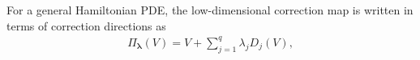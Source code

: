 \documentclass[11pt,a4paper]{article}
\theoremstyle{definition}
\theoremstyle{remark}
\numberwithin{equation}{section}
\numberwithin{figure}{section}
\numberwithin{table}{section}
\begin{document}

For a general Hamiltonian PDE, the low-dimensional correction map is written in terms of correction directions as
\begin{align}\label{correct}
     \Pi_{\boldsymbol\lambda}(V)
    =
    V
    +
    \sum_{j=1}^{q}
    \lambda_j D_j(V),
\end{align}
\end{document}
